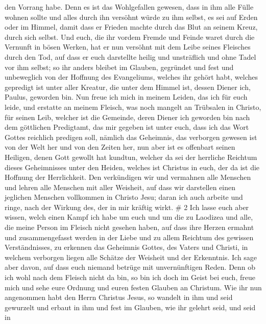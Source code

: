 den Vorrang habe.  Denn es ist das Wohlgefallen gewesen,
dass in ihm alle Fülle wohnen sollte  und alles durch ihn
versöhnt würde zu ihm selbst, es sei auf Erden oder im Himmel, damit
dass er Frieden machte durch das Blut an seinem Kreuz, durch sich
selbst.  Und euch, die ihr vordem Fremde und Feinde waret
durch die Vernunft in bösen Werken,  hat er nun versöhnt
mit dem Leibe seines Fleisches durch den Tod, auf dass er euch
darstellte heilig und unsträflich und ohne Tadel vor ihm selbst;
 so ihr anders bleibet im Glauben, gegründet und fest und
unbeweglich von der Hoffnung des Evangeliums, welches ihr gehört habt,
welches gepredigt ist unter aller Kreatur, die unter dem Himmel ist,
dessen Diener ich, Paulus, geworden bin.  Nun freue ich
mich in meinem Leiden, das ich für euch leide, und erstatte an meinem
Fleisch, was noch mangelt an Trübsalen in Christo, für seinen Leib,
welcher ist die Gemeinde,  deren Diener ich geworden bin
nach dem göttlichen Predigtamt, das mir gegeben ist unter euch, dass ich
das Wort Gottes reichlich predigen soll,  nämlich das
Geheimnis, das verborgen gewesen ist von der Welt her und von den Zeiten
her, nun aber ist es offenbart seinen Heiligen,  denen Gott
gewollt hat kundtun, welcher da sei der herrliche Reichtum dieses
Geheimnisses unter den Heiden, welches ist Christus in euch, der da ist
die Hoffnung der Herrlichkeit.  Den verkündigen wir und
vermahnen alle Menschen und lehren alle Menschen mit aller Weisheit, auf
dass wir darstellen einen jeglichen Menschen vollkommen in Christo Jesu;
 daran ich auch arbeite und ringe, nach der Wirkung des,
der in mir kräftig wirkt. \# 2  Ich lasse euch aber wissen,
welch einen Kampf ich habe um euch und um die zu Laodizea und alle, die
meine Person im Fleisch nicht gesehen haben,  auf dass ihre
Herzen ermahnt und zusammengefasst werden in der Liebe und zu allem
Reichtum des gewissen Verständnisses, zu erkennen das Geheimnis Gottes,
des Vaters und Christi,  in welchem verborgen liegen alle
Schätze der Weisheit und der Erkenntnis.  Ich sage aber
davon, auf dass euch niemand betrüge mit unvernünftigen Reden.
 Denn ob ich wohl nach dem Fleisch nicht da bin, so bin ich
doch im Geist bei euch, freue mich und sehe eure Ordnung und euren
festen Glauben an Christum.  Wie ihr nun angenommen habt den
Herrn Christus Jesus, so wandelt in ihm  und seid gewurzelt
und erbaut in ihm und fest im Glauben, wie ihr gelehrt seid, und seid in
